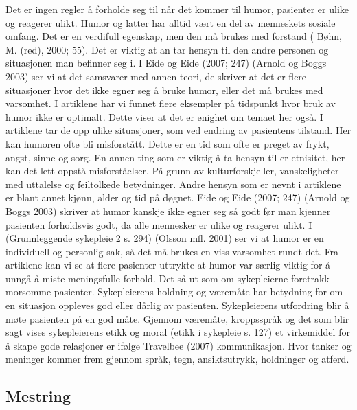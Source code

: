 Det er ingen regler å forholde seg til når det kommer til humor, pasienter er
ulike og reagerer ulikt. Humor og latter har alltid vært en del av menneskets
sosiale omfang. Det er en verdifull egenskap, men den må brukes med forstand (
Bøhn, M. (red), 2000; 55). Det er viktig at an tar hensyn til den andre
personen og situasjonen man befinner seg i. I Eide og Eide (2007; 247) (Arnold
og Boggs 2003) ser vi at det samsvarer med annen teori, de skriver at det er
flere situasjoner hvor det ikke egner seg å bruke humor, eller det må brukes
med varsomhet. I artiklene har vi funnet flere eksempler på tidspunkt hvor bruk
av humor ikke er optimalt. Dette viser at det er enighet om temaet her også.  I
artiklene tar de opp ulike situasjoner, som ved endring av pasientens tilstand.
Her kan humoren ofte bli misforstått. Dette er en tid som ofte er preget av
frykt, angst, sinne og sorg. En annen ting som er viktig å ta hensyn til er
etnisitet, her kan det lett oppstå misforståelser. På grunn av
kulturforskjeller, vanskeligheter med uttalelse og feiltolkede betydninger.
Andre hensyn som er nevnt i artiklene er blant annet kjønn, alder og tid på
døgnet. Eide og Eide (2007; 247) (Arnold og Boggs 2003) skriver at humor
kanskje ikke egner seg så godt før man kjenner pasienten forholdsvis godt, da
alle mennesker er ulike og reagerer ulikt. I (Grunnleggende sykepleie 2 s. 294)
(Olsson mfl. 2001) ser vi at humor er en individuell og personlig sak, så det
må brukes en viss varsomhet rundt det.  Fra artiklene kan vi se at flere
pasienter uttrykte at  humor var særlig viktig for å unngå å miste meningsfulle
forhold. Det så ut som om sykepleierne foretrakk morsomme pasienter.
Sykepleierens holdning og væremåte har betydning for om en situasjon oppleves
god eller dårlig av pasienten. Sykepleierens utfordring blir å møte pasienten
på en god måte. Gjennom væremåte, kroppsspråk og det som blir sagt vises
sykepleierens etikk og moral (etikk i sykepleie s. 127) et virkemiddel for å
skape gode relasjoner er ifølge Travelbee (2007) kommunikasjon. Hvor tanker og
meninger kommer frem gjennom språk, tegn, ansiktsutrykk, holdninger og atferd.

\subsection{Mestring}

